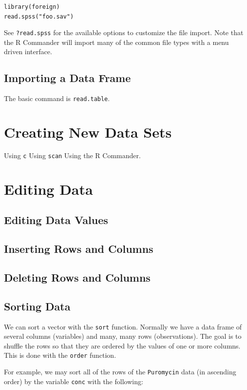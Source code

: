 \documentclass[captions=tableheading]{scrbook}
\begin{document}
\begin{verbatim}
library(foreign)
read.spss("foo.sav")
\end{verbatim}

See \texttt{?read.spss} for the available options to customize the file import. Note that the \textsf{R} Commander will import many of the common file types with a menu driven interface.
\subsection{Importing a Data Frame}
\label{sec-20-2-4}


The basic command is \texttt{read.table}.
\section{Creating New Data Sets \label{sec:Creating-New-Data}}
\label{sec-20-3}

Using \texttt{c}
Using \texttt{scan}
Using the \textsf{R} Commander.
\section{Editing Data \label{sec:Editing-Data-Sets}}
\label{sec-20-4}
\subsection{Editing Data Values}
\label{sec-20-4-1}
\subsection{Inserting Rows and Columns}
\label{sec-20-4-2}
\subsection{Deleting Rows and Columns}
\label{sec-20-4-3}
\subsection{Sorting Data}
\label{sec-20-4-4}


We can sort a vector with the \texttt{sort} function. Normally we have a data frame of several columns (variables) and many, many rows (observations). The goal is to shuffle the rows so that they are ordered by the values of one or more columns. This is done with the \texttt{order} function. 

For example, we may sort all of the rows of the \texttt{Puromycin} data (in ascending order) by the variable \texttt{conc} with the following: 
\end{document}
